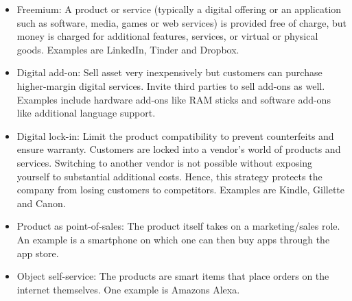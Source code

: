 \begin{mytitle}\hfill
\begin{itemize}
    \item Freemium: A product or service (typically a digital offering or an application such as software, media, games or web services) is provided free of charge, but money is charged for additional features, services, or virtual or physical goods. Examples are LinkedIn, Tinder and Dropbox.
    \item Digital add-on: Sell asset very inexpensively but customers can purchase higher-margin digital services. Invite third parties to sell add-ons as well. Examples include hardware add-ons like RAM sticks and software add-ons like additional language support.
    \item Digital lock-in: Limit the product compatibility to prevent counterfeits and ensure warranty. Customers are locked into a vendor’s world of products and services. Switching to another vendor is not possible without exposing yourself to substantial additional costs. Hence, this strategy protects the company from losing customers to competitors. Examples are Kindle, Gillette and Canon.
    \item Product as point-of-sales: The product itself takes on a marketing/sales role. An example is a smartphone on which one can then buy apps through the app store.
    \item Object self-service: The products are smart items that place orders on the internet themselves. One example is Amazons Alexa.
\end{itemize}
\end{mytitle}